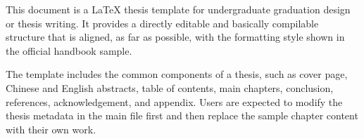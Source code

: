 \begin{enabstract}
This document is a LaTeX thesis template for undergraduate graduation design or thesis writing. It provides a directly editable and basically compilable structure that is aligned, as far as possible, with the formatting style shown in the official handbook sample.

The template includes the common components of a thesis, such as cover page, Chinese and English abstracts, table of contents, main chapters, conclusion, references, acknowledgement, and appendix. Users are expected to modify the thesis metadata in the main file first and then replace the sample chapter content with their own work.
\end{enabstract}
